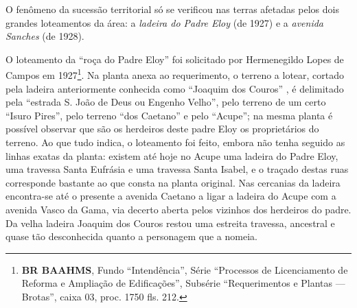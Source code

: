
O fenômeno da sucessão territorial só se verificou nas terras afetadas pelos dois grandes loteamentos da área: a \textit{ladeira do Padre Eloy} (de 1927) e a \textit{avenida Sanches} (de 1928).

O loteamento da ``roça do Padre Eloy'' foi solicitado por Hermenegildo Lopes de Campos em 1927\footnote{\textbf{BR BAAHMS}, Fundo ``Intendência'', Série ``Processos de Licenciamento de Reforma e Ampliação de Edificações'', Subsérie ``Requerimentos e Plantas --- Brotas'', caixa 03, proc. 1750 fls. 212.}. Na planta anexa ao requerimento, o terreno a lotear, cortado pela ladeira anteriormente conhecida como ``Joaquim dos Couros'' \cite[p.~101]{souza_guia_1935}, é delimitado pela ``estrada S. João de Deus ou Engenho Velho'', pelo terreno de um certo ``Isuro Pires'', pelo terreno ``dos Caetano'' e pelo ``Acupe''; na mesma planta é possível observar que são os herdeiros deste padre Eloy os proprietários do terreno. Ao que tudo indica, o loteamento foi feito, embora não tenha seguido as linhas exatas da planta: existem até hoje no Acupe uma ladeira do Padre Eloy, uma travessa Santa Eufrásia e uma travessa Santa Isabel, e o traçado destas ruas corresponde bastante ao que consta na planta original. Nas cercanias da ladeira encontra-se até o presente a avenida Caetano a ligar a ladeira do Acupe com a avenida Vasco da Gama, via decerto aberta pelos vizinhos dos herdeiros do padre. Da velha ladeira Joaquim dos Couros restou uma estreita travessa, ancestral e quase tão desconhecida quanto a personagem que a nomeia. 


